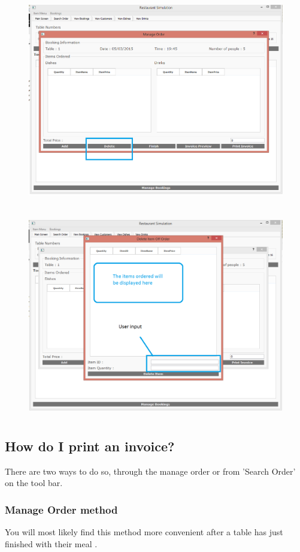 \begin{figure}[H]
    \includegraphics[height = 9cm]{./Manual/images/DeleteItemOrder1} 
    \caption{} \label{fig:deleteitemorder2}
\end{figure}

\begin{figure}[H]
    \includegraphics[height = 9cm]{./Manual/images/DeleteItemOrder2} 
    \caption{} \label{fig:deleteitemorder3}
\end{figure}

\newpage
\subsection{How do I print an invoice?}
There are two ways to do so, through the manage order or from 'Search Order' on the tool bar.

\subsubsection{Manage Order method}
You will most likely find this method more convenient after a table has just finished with their meal .



